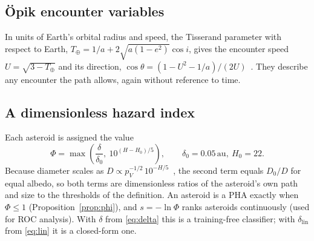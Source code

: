 \documentclass[conference]{IEEEtran}
\newcommand{\au}{\,\mathrm{au}}
\begin{document}
\subsection{Öpik encounter variables}
In units of Earth's orbital radius and speed, the Tisserand parameter with respect to Earth, $T_\oplus = 1/a + 2\sqrt{a(1-e^2)}\cos i$, gives the encounter speed $U = \sqrt{3 - T_\oplus}$ and its direction, $\cos\theta = (1 - U^2 - 1/a)/(2U)$~\cite{opik1976,valsecchi2003}. They describe any encounter the path allows, again without reference to time.

\subsection{A dimensionless hazard index}
Each asteroid is assigned the value
\begin{equation}
\Phi = \max\!\left( \frac{\delta}{\delta_0},\ 10^{(H - H_0)/5} \right), \qquad \delta_0 = 0.05\au,\ H_0 = 22 .
\label{eq:phi}
\end{equation}
Because diameter scales as $D \propto p_V^{-1/2}\,10^{-H/5}$~\cite{pravec2007}, the second term equals $D_0/D$ for equal albedo, so both terms are dimensionless ratios of the asteroid's own path and size to the thresholds of the definition. An asteroid is a PHA exactly when $\Phi \le 1$ (Proposition~\ref{prop:phi}), and $s = -\ln\Phi$ ranks asteroids continuously (used for ROC analysis). With $\delta$ from \eqref{eq:delta} this is a training-free classifier; with $\delta_{\mathrm{lin}}$ from \eqref{eq:lin} it is a closed-form one.
\end{document}
